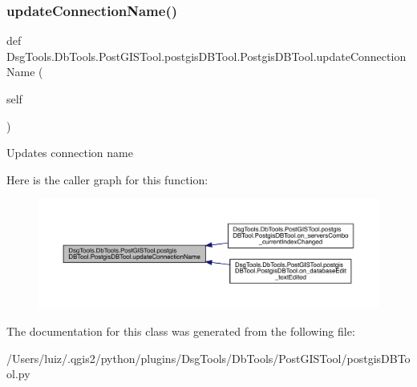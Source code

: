 \subsubsection{\texorpdfstring{update\+Connection\+Name()}{updateConnectionName()}}
{\footnotesize\ttfamily def Dsg\+Tools.\+Db\+Tools.\+Post\+G\+I\+S\+Tool.\+postgis\+D\+B\+Tool.\+Postgis\+D\+B\+Tool.\+update\+Connection\+Name (\begin{DoxyParamCaption}\item[{}]{self }\end{DoxyParamCaption})}

\begin{DoxyVerb}Updates connection name
\end{DoxyVerb}
 Here is the caller graph for this function\+:
\nopagebreak
\begin{figure}[H]
\begin{center}
\leavevmode
\includegraphics[width=350pt]{class_dsg_tools_1_1_db_tools_1_1_post_g_i_s_tool_1_1postgis_d_b_tool_1_1_postgis_d_b_tool_a8e83dd803b5cf94e8bf42974a3d91635_icgraph}
\end{center}
\end{figure}


The documentation for this class was generated from the following file\+:\begin{DoxyCompactItemize}
\item 
/\+Users/luiz/.\+qgis2/python/plugins/\+Dsg\+Tools/\+Db\+Tools/\+Post\+G\+I\+S\+Tool/postgis\+D\+B\+Tool.\+py\end{DoxyCompactItemize}
